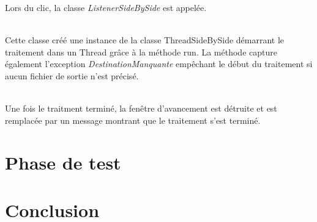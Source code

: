 \documentclass[10pt,a4paper]{article}
\begin{document}
Lors du clic, la classe \textit{ListenerSideBySide} est appelée.


~~\\

Cette classe créé une instance de la classe ThreadSideBySide démarrant le traitement dans un Thread grâce à la méthode run. La méthode capture également l'exception \textit{DestinationManquante} empêchant
le début du traitement si aucun fichier de sortie n'est précisé.


~~\\

Une fois le traitment terminé, la fenêtre d'avancement est détruite et est remplacée par un message montrant que le traitement s'est terminé.


\section{Phase de test}

\section{Conclusion}



\end{document}
